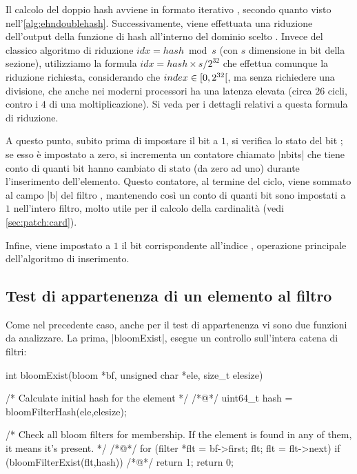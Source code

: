 Il calcolo del doppio hash avviene in formato iterativo , secondo quanto visto
nell'\autoref{alg:ehndoublehash}. Successivamente, viene effettuata una riduzione dell'output della
funzione di hash all'interno del dominio scelto . Invece del classico algoritmo di
riduzione $idx = hash \bmod s$ (con $s$ dimensione in bit della sezione), utilizziamo la formula
$idx = hash \times s / 2^{32}$ che effettua comunque la riduzione richiesta, considerando che $index
\in \interval[open right]{0}{2^{32}}$, ma senza richiedere una divisione, che anche nei moderni
processori ha una latenza elevata (circa $26$ cicli, contro i $4$ di una moltiplicazione). Si veda
\cite{lemire-reduction} per i dettagli relativi a questa formula di riduzione.

A questo punto, subito prima di impostare il bit a $1$, si verifica lo stato del bit ; se
esso è impostato a zero, si incrementa un contatore chiamato \cverb|nbits| che tiene conto di quanti
bit hanno cambiato di stato (da zero ad uno) durante l'inserimento dell'elemento. Questo contatore,
al termine del ciclo, viene sommato al campo \cverb|b| del filtro , mantenendo così un conto
di quanti bit sono impostati a $1$ nell'intero filtro, molto utile per il calcolo della cardinalità
(vedi \autoref{sec:patch:card}).

Infine, viene impostato a $1$ il bit corrispondente all'indice , o\-pe\-ra\-zio\-ne
principale dell'algoritmo di inserimento.

\subsection{Test di appartenenza di un elemento al filtro}

Come nel precedente caso, anche per il test di appartenenza vi sono due funzioni da analizzare.
La prima, \cverb|bloomExist|, esegue un controllo sull'intera catena di filtri:

\begin{commentedsource}[style=csource,caption=Test di appartenenza di un elemento,label={lst:bloomExist}]
int bloomExist(bloom *bf, unsigned char *ele, size_t elesize) {
    /* Calculate initial hash for the element */
/*@\lnote@*/    uint64_t hash = bloomFilterHash(ele,elesize);

    /* Check all bloom filters for membership. If the element is
       found in any of them, it means it's present. */
/*@\lnote@*/    for (filter *flt = bf->first; flt; flt = flt->next)
        if (bloomFilterExist(flt,hash))
/*@\lnote@*/            return 1;
    return 0;
}
\end{commentedsource}

